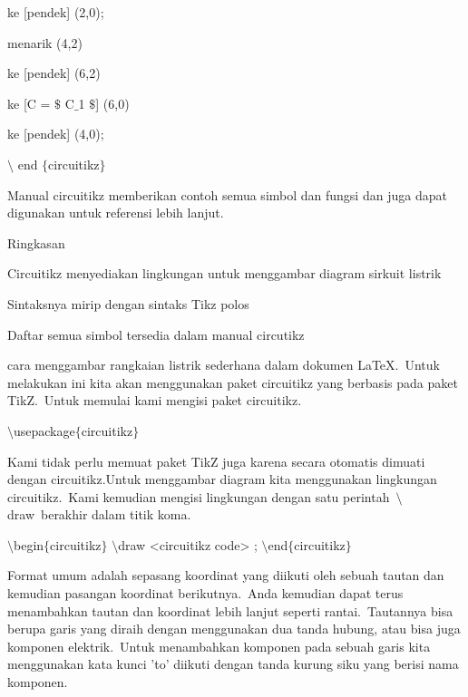 \noindent 
 ke [pendek] (2,0);
\par


\noindent 
 menarik (4,2)
\par


\noindent 
 ke [pendek] (6,2)
\par


\noindent 
 ke [C = $\$$ C$ \_ $1 $\$$] (6,0)
\par


\noindent 
 ke [pendek] (4,0);
\par


\noindent 
 $\setminus$ end $ \{ $circuitikz$ \} $ 
\par


\noindent 
Manual circuitikz memberikan contoh semua simbol dan fungsi dan juga dapat digunakan untuk referensi lebih lanjut.
\par


\noindent 
Ringkasan
\par


\noindent 
Circuitikz menyediakan lingkungan untuk menggambar diagram sirkuit listrik
\par


\noindent 
Sintaksnya mirip dengan sintaks Tikz polos
\par


\noindent 
Daftar semua simbol tersedia dalam manual circutikz
\par


\noindent 
cara menggambar rangkaian listrik sederhana dalam dokumen LaTeX. Untuk melakukan ini kita akan menggunakan paket circuitikz yang berbasis pada paket TikZ. Untuk memulai kami mengisi paket circuitikz.
\par


\noindent 
$\setminus$usepackage$ \{ $circuitikz$ \} $ 
\par


\noindent 
Kami tidak perlu memuat paket TikZ juga karena secara otomatis dimuati dengan circuitikz.Untuk menggambar diagram kita menggunakan lingkungan circuitikz. Kami kemudian mengisi lingkungan dengan satu perintah $\setminus$draw berakhir dalam titik koma.
\par


\noindent 
 $\setminus$begin$ \{ $circuitikz$ \} $ $\setminus$draw <circuitikz code> ; $\setminus$end$ \{ $circuitikz$ \} $ 
\par


\noindent 
Format umum adalah sepasang koordinat yang diikuti oleh sebuah tautan dan kemudian pasangan koordinat berikutnya. Anda kemudian dapat terus menambahkan tautan dan koordinat lebih lanjut seperti rantai. Tautannya bisa berupa garis yang diraih dengan menggunakan dua tanda hubung, atau bisa juga komponen elektrik. Untuk menambahkan komponen pada sebuah garis kita menggunakan kata kunci 'to' diikuti dengan tanda kurung siku yang berisi nama komponen.
\par


